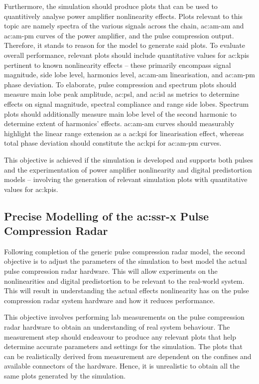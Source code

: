 Furthermore, the simulation should produce plots that can be used to quantitively analyse power amplifier nonlinearity effects. Plots relevant to this topic are namely spectra of the various signals across the chain, \gls{ac:am-am} and \gls{ac:am-pm} curves of the power amplifier, and the pulse compression output. Therefore, it stands to reason for the model to generate said plots. To evaluate overall performance, relevant plots should include quantitative values for \glspl{ac:kpi} pertinent to known nonlinearity effects – these primarily encompass signal magnitude, side lobe level, harmonics level, \gls{ac:am-am} linearisation, and \gls{ac:am-pm} phase deviation. To elaborate, pulse compression and spectrum plots should measure main lobe peak amplitude, \gls{ac:psl}, and \gls{ac:isl} as metrics to determine effects on signal magnitude, spectral compliance and range side lobes. Spectrum plots should additionally measure main lobe level of the second harmonic to determine extent of harmonics’ effects. \gls{ac:am-am} curves should measurably highlight the linear range extension as a \gls{ac:kpi} for linearisation effect, whereas total phase deviation should constitute the \gls{ac:kpi} for \gls{ac:am-pm} curves. 

This objective is achieved if the simulation is developed and supports both pulses and the experimentation of power amplifier nonlinearity and digital predistortion models – involving the generation of relevant simulation plots with quantitative values for \glspl{ac:kpi}. 

\subsection{Precise Modelling of the \gls{ac:ssr-x} Pulse Compression Radar}

Following completion of the generic pulse compression radar model, the second objective is to adjust the parameters of the simulation to best model the actual pulse compression radar hardware. This will allow experiments on the nonlinearities and digital predistortion to be relevant to the real-world system. This will result in understanding the actual effects nonlinearity has on the pulse compression radar system hardware and how it reduces performance.

This objective involves performing lab measurements on the pulse compression radar hardware to obtain an understanding of real system behaviour. The measurement step should endeavour to produce any relevant plots that help determine accurate parameters and settings for the simulation. The plots that can be realistically derived from measurement are dependent on the confines and available connectors of the hardware. Hence, it is unrealistic to obtain all the same plots generated by the simulation. 

